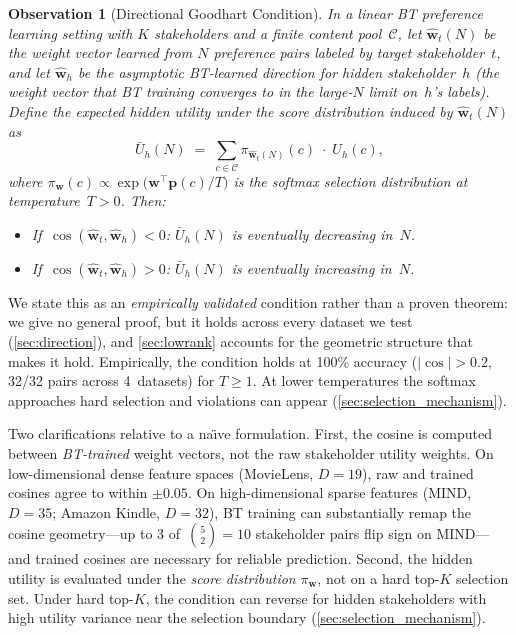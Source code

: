 \documentclass[11pt,letterpaper]{article}
\newtheorem{proposition}{Observation}
\begin{document}
\begin{proposition}[Directional Goodhart Condition]
\label{prop:direction}
In a linear BT preference learning setting with $K$ stakeholders and a
finite content pool~$\mathcal{C}$, let $\hat{\mathbf{w}}_t(N)$ be the
weight vector learned from $N$ preference pairs labeled by target
stakeholder~$t$, and let $\hat{\mathbf{w}}_h$ be the asymptotic BT-learned direction
for hidden stakeholder~$h$ (the weight vector that BT training
converges to in the large-$N$ limit on~$h$'s labels). Define the expected hidden utility under the
score distribution induced by $\hat{\mathbf{w}}_t(N)$ as
\begin{equation}
  \bar{U}_h(N) \;=\; \sum_{c \in \mathcal{C}}
    \pi_{\hat{\mathbf{w}}_t(N)}(c) \;\cdot\; U_h(c),
  \label{eq:expected_util}
\end{equation}
where $\pi_{\mathbf{w}}(c) \propto
\exp\!\bigl(\mathbf{w}^\top \mathbf{p}(c) / T\bigr)$ is the
softmax selection distribution at temperature~$T > 0$. Then:
\begin{itemize}
  \item If\, $\cos(\hat{\mathbf{w}}_t, \hat{\mathbf{w}}_h) < 0$:\;
    $\bar{U}_h(N)$ is eventually decreasing in~$N$.
  \item If\, $\cos(\hat{\mathbf{w}}_t, \hat{\mathbf{w}}_h) > 0$:\;
    $\bar{U}_h(N)$ is eventually increasing in~$N$.
\end{itemize}
\end{proposition}

We state this as an \emph{empirically validated} condition rather than
a proven theorem: we give no general proof, but it holds across every
dataset we test (\cref{sec:direction}), and \cref{sec:lowrank} accounts
for the geometric structure that makes it hold. Empirically, the
condition holds at 100\% accuracy ($|\cos| > 0.2$,
32/32 pairs across 4~datasets) for $T \geq 1$. At lower temperatures
the softmax approaches hard selection and violations can appear
(\cref{sec:selection_mechanism}).

Two clarifications relative to a na\"{\i}ve formulation. First, the
cosine is computed between \emph{BT-trained} weight vectors, not the
raw stakeholder utility weights. On low-dimensional dense feature
spaces (MovieLens, $D{=}19$), raw and trained cosines agree to within
$\pm 0.05$. On high-dimensional sparse features (MIND, $D{=}35$;
Amazon Kindle, $D{=}32$), BT training can substantially remap the
cosine geometry---up to 3 of~$\binom{5}{2}{=}10$ stakeholder pairs
flip sign on MIND---and trained
cosines are necessary for reliable prediction. Second, the hidden
utility is evaluated under the \emph{score distribution}
$\pi_{\mathbf{w}}$, not on a hard top-$K$ selection set. Under hard
top-$K$, the condition can reverse for hidden stakeholders with high
utility variance near the selection boundary
(\cref{sec:selection_mechanism}).
\end{document}
